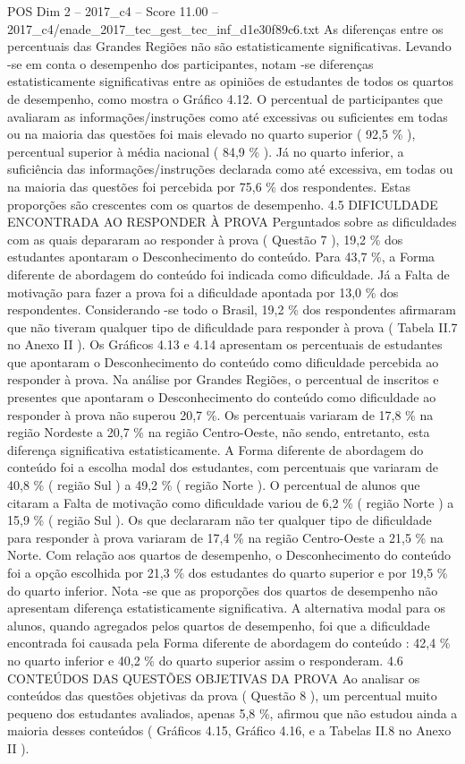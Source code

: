 \begin{textsample}{POS Dim 2 – 2017\_c4 – Score 11.00 – 2017\_c4/enade\_2017\_tec\_gest\_tec\_inf\_d1e30f89c6.txt}
As diferenças entre os percentuais das Grandes Regiões não são estatisticamente significativas.
Levando -se em conta o desempenho dos participantes, notam -se diferenças estatisticamente significativas entre as opiniões de estudantes de todos os quartos de desempenho, como mostra o Gráfico 4.12.
O percentual de participantes que avaliaram as informações/instruções como até excessivas ou suficientes em todas ou na maioria das questões foi mais elevado no quarto superior ( 92,5 \% ), percentual superior à média nacional ( 84,9 \% ).
Já no quarto inferior, a suficiência das informações/instruções declarada como até excessiva, em todas ou na maioria das questões foi percebida por 75,6 \% dos respondentes.
Estas proporções são crescentes com os quartos de desempenho. 4.5 DIFICULDADE ENCONTRADA AO RESPONDER À PROVA Perguntados sobre as dificuldades com as quais depararam ao responder à prova ( Questão 7 ), 19,2 \% dos estudantes apontaram o Desconhecimento do conteúdo.
Para 43,7 \%, a Forma diferente de abordagem do conteúdo foi indicada como dificuldade.
Já a Falta de motivação para fazer a prova foi a dificuldade apontada por 13,0 \% dos respondentes.
Considerando -se todo o Brasil, 19,2 \% dos respondentes afirmaram que não tiveram qualquer tipo de dificuldade para responder à prova ( Tabela II.7 no Anexo II ).
Os Gráficos 4.13 e 4.14 apresentam os percentuais de estudantes que apontaram o Desconhecimento do conteúdo como dificuldade percebida ao responder à prova.
Na análise por Grandes Regiões, o percentual de inscritos e presentes que apontaram o Desconhecimento do conteúdo como dificuldade ao responder à prova não superou 20,7 \%.
Os percentuais variaram de 17,8 \% na região Nordeste a 20,7 \% na região Centro-Oeste, não sendo, entretanto, esta diferença significativa estatisticamente.
A Forma diferente de abordagem do conteúdo foi a escolha modal dos estudantes, com percentuais que variaram de 40,8 \% ( região Sul ) a 49,2 \% ( região Norte ).
O percentual de alunos que citaram a Falta de motivação como dificuldade variou de 6,2 \% ( região Norte ) a 15,9 \% ( região Sul ).
Os que declararam não ter qualquer tipo de dificuldade para responder à prova variaram de 17,4 \% na região Centro-Oeste a 21,5 \% na Norte.
Com relação aos quartos de desempenho, o Desconhecimento do conteúdo foi a opção escolhida por 21,3 \% dos estudantes do quarto superior e por 19,5 \% do quarto inferior.
Nota -se que as proporções dos quartos de desempenho não apresentam diferença estatisticamente significativa.
A alternativa modal para os alunos, quando agregados pelos quartos de desempenho, foi que a dificuldade encontrada foi causada pela Forma diferente de abordagem do conteúdo : 42,4 \% no quarto inferior e 40,2 \% do quarto superior assim o responderam. 4.6 CONTEÚDOS DAS QUESTÕES OBJETIVAS DA PROVA Ao analisar os conteúdos das questões objetivas da prova ( Questão 8 ), um percentual muito pequeno dos estudantes avaliados, apenas 5,8 \%, afirmou que não estudou ainda a maioria desses conteúdos ( Gráficos 4.15, Gráfico 4.16, e a Tabelas II.8 no Anexo II ).

\end{textsample}
